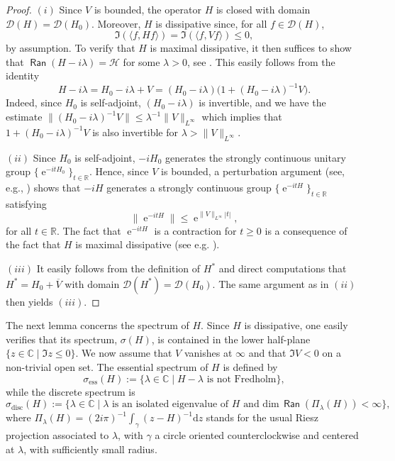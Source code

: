 \documentclass{article}
\def\C{\mathbb C}
\def\d{\mathrm{d}}
\def\H{\mathcal H}
\def\R{\mathbb R}
\def\dom{\mathcal D}
\def\e{\mathop{\mathrm{e}}\nolimits}
\def\Ran{\mathop{\mathsf{Ran}}\nolimits}
\def\dim{\mathop{\mathrm{dim}}\nolimits}
\def\ess{{\mathrm{ess}}}
\def\disc{{\mathrm{disc}}}
\def\dim{{\mathrm{dim}}}
\begin{document}
\begin{proof}
$(i)$ Since $V$ is bounded, the operator $H$ is closed with domain $\dom( H ) = \dom( H_0 )$. Moreover, $H$ is dissipative since, for all $f \in \dom( H )$,
\begin{equation*}
\Im( \langle f , H f \rangle ) = \Im ( \langle f , V f \rangle ) \le 0,
\end{equation*}
by assumption. To verify that $H$ is maximal dissipative, it then suffices to show that $\Ran( H - i \lambda ) = \H$ for some $\lambda > 0$, see \cite[Corol.~p.~201]{Ph59_01}. This easily follows from the identity
\begin{equation*}
H - i \lambda = H_0 - i \lambda + V =  (H_0-i\lambda) \big(1+( H_0 - i \lambda )^{-1} V \big ).
\end{equation*}
Indeed, since $H_0$ is self-adjoint, $(H_0-i\lambda)$ is invertible, and we have the estimate $\|( H_0 - i \lambda)^{-1} V\|\le\lambda^{-1}\|V\|_{L^\infty}$ which implies that $1+( H_0 - i \lambda )^{-1} V$ is also invertible for $\lambda>\|V\|_{L^\infty}$.

$(ii)$ Since $H_0$ is self-adjoint, $-iH_0$ generates the strongly continuous unitary group $\{ \e^{-itH_0} \}_{ t \in \R}$. Hence, since $V$ is bounded, a perturbation argument (see, e.g., \cite[Thm.~11.4.1]{Da07_01}) shows that $-iH$ generates a strongly continuous group $\{ \e^{-itH} \}_{ t \in \R}$ satisfying 
$$
\big\|\e^{-itH} \big\| \le \e^{\|V\|_{L^\infty}|t|},
$$
 for all $t \in \R$. The fact that $\e^{-itH}$ is a contraction for $t \ge 0$ is a consequence of the fact that $H$ is maximal dissipative (see e.g. \cite[Thm.~10.4.2]{Da07_01}).

$(iii)$ It easily follows from the definition of $H^*$ and direct computations that $H^* = H_0 + \overline{V}$ with domain $\dom( H^* ) = \dom( H_0 )$. The same argument as in $(ii)$ then yields $(iii)$.
\end{proof}

The next lemma concerns the spectrum of $H$. Since $H$ is dissipative, one easily verifies that its spectrum, $\sigma(H)$, is contained in the lower half-plane $\{ z\in\C \mid \Im z\le0\}$. We now assume that $V$ vanishes at $\infty$ and that $\Im V<0$ on a non-trivial open set. The essential spectrum of $H$ is defined by
$$
\sigma_\ess(H):=\{\lambda\in\C \mid H-\lambda\text{ is not Fredholm}\},
$$
while the discrete spectrum is
$$
\sigma_\disc(H):=\{\lambda\in\C \mid \lambda \text{ is an isolated eigenvalue of } H \text{ and } \dim\,\Ran(\Pi_\lambda(H)) < \infty \} ,
$$
where $\Pi_\lambda(H)=(2i\pi)^{-1}\int_\gamma(z-H)^{-1}\d z$ stands for the usual Riesz projection associated to $\lambda$, with $\gamma$ a circle oriented counterclockwise and centered at $\lambda$, with sufficiently small radius.
\end{document}
